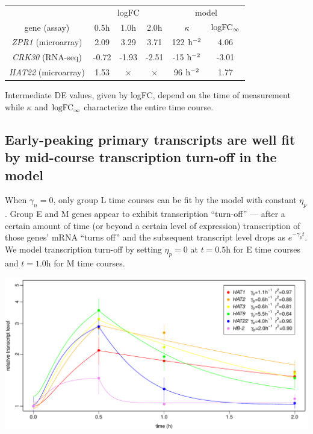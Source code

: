 \documentclass[aspb,landscape]{a0poster}
\newlength{\figwidth}
\newlength{\figtopspace}
\begin{document}
\begin{multicols}{3}
  \begin{center}
    \begin{tabular}{c|ccc|cc}
      \multicolumn{1}{c}{}        & \multicolumn{3}{c}{logFC} & \multicolumn{2}{c}{model} \\ 
      \multicolumn{1}{c}{gene (assay)} & 0.5h & 1.0h & \multicolumn{1}{c}{2.0h}  & $\kappa$        & $\rm logFC_\infty$ \\
      \midrule
      \textit{ZPR1}  (microarray) & 2.09 & 3.29 & 3.71         & 122 $\rm h^{-2}$ & 4.06 \\
      \textit{CRK30} (RNA-seq)    & -0.72 & -1.93 & -2.51      & -15 $\rm h^{-2}$ & -3.01 \\
      \textit{HAT22} (microarray) & 1.53 & $\times$ & $\times$ &  96 $\rm h^{-2}$ & 1.77 \\
    \end{tabular}
  \end{center}

  Intermediate DE values, given by logFC, depend on the time of measurement while $\kappa$ and ${\rm logFC}_\infty$ characterize the entire time course.

  \subsection*{Early-peaking primary transcripts are well fit by mid-course transcription turn-off in the model}

  When $\gamma_n=0$, only group L time courses can be fit by the model with constant $\eta_p$. Group E and M genes appear to exhibit transcription
  ``turn-off'' --- after a certain amount of time (or beyond a certain level of expression) transcription of those genes' mRNA ``turns off'' and the subsequent transcript level
  drops as $e^{-\gamma_p t}$. We model transcription turn-off by setting $\eta_p=0$ at $t=0.5$h for E time courses and $t=1.0$h for M time courses.

  \begin{center}\vspace{\figtopspace}
    \includegraphics[width=\figwidth]{hdzip}
  \end{center}


\end{multicols}
\end{document}
